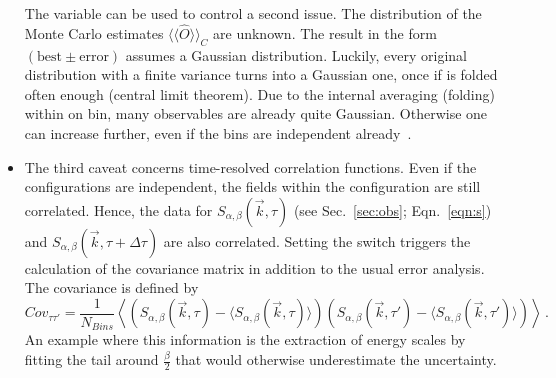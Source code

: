 \begin{itemize}
The  variable can be used to control a second issue. The distribution of the Monte Carlo estimates $\langle\langle\hat{O}\rangle\rangle_C$ are unknown. The result in the form $(\mathrm{best}\pm \mathrm{error})$ assumes a Gaussian distribution. Luckily, every original distribution with a finite variance turns into a Gaussian one, once if is folded often enough (central limit theorem). Due to the internal averaging (folding) within on bin, many observables are already quite Gaussian. Otherwise one can increase  further, even if the bins are independent already~\cite{Bercx17}.
	\item The third caveat concerns time-resolved correlation functions. Even if the configurations are independent, the fields within the configuration are still correlated. Hence, the data for $S_{\alpha,\beta}(\vec{k},\tau)$ (see Sec.~\ref{sec:obs}; Eqn.~\ref{eqn:s}) and $S_{\alpha,\beta}(\vec{k},\tau+\Delta\tau)$ are also correlated. Setting the switch  triggers the calculation of the covariance matrix in addition to the usual error analysis. The covariance is defined by
	\begin{equation}
		Cov_{\tau \tau'}=\frac{1}{N_{Bins}}\left\langle\left(S_{\alpha,\beta}(\vec{k},\tau)-\langle S_{\alpha,\beta}(\vec{k},\tau)\rangle\right)\left(S_{\alpha,\beta}(\vec{k},\tau')-\langle S_{\alpha,\beta}(\vec{k},\tau')\rangle\right)\right\rangle\,.
	\end{equation}
	An example where this information is the extraction of energy scales by fitting the tail around $\frac{\beta}{2}$ that would otherwise underestimate the uncertainty.
\end{itemize}
